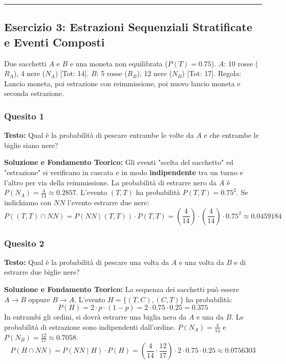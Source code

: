 \documentclass[12pt, a4paper]{article}
\begin{document}
\vspace{0.5cm}\hrule\vspace{0.5cm}

\subsection*{Esercizio 3: Estrazioni Sequenziali Stratificate e Eventi Composti}
Due sacchetti $A$ e $B$ e una moneta non equilibrata ($P(T)=0.75$). 
$A$: 10 rosse ($R_A$), 4 nere ($N_A$) [Tot: 14]. 
$B$: 5 rosse ($R_B$), 12 nere ($N_B$) [Tot: 17]. 
Regola: Lancio moneta, poi estrazione con reimmissione, poi nuovo lancio moneta e seconda estrazione.

\subsubsection*{Quesito 1}
\textbf{Testo:} Qual è la probabilità di pescare entrambe le volte da $A$ e che entrambe le biglie siano nere?

\textbf{Soluzione e Fondamento Teorico:} 
Gli eventi "scelta del sacchetto" ed "estrazione" si verificano in cascata e in modo \textbf{indipendente} tra un turno e l'altro per via della reimmissione.
La probabilità di estrarre nero da $A$ è $P(N_A) = \frac{4}{14} \approx 0.2857$.
L'evento $(T,T)$ ha probabilità $P(T,T) = 0.75^2$. Se indichiamo con $NN$ l'evento estrarre due nere:
$$ P((T,T) \cap NN) = P(NN \mid (T,T)) \cdot P(T,T) = \left(\frac{4}{14}\right) \cdot \left(\frac{4}{14}\right) \cdot 0.75^2 \approx 0.0459184 $$

\subsubsection*{Quesito 2}
\textbf{Testo:} Qual è la probabilità di pescare una volta da $A$ e una volta da $B$ e di estrarre due biglie nere?

\textbf{Soluzione e Fondamento Teorico:} 
La sequenza dei sacchetti può essere $A \to B$ oppure $B \to A$. L'evento $H = \{(T,C), (C,T)\}$ ha probabilità:
$$ P(H) = 2 \cdot p \cdot (1-p) = 2 \cdot 0.75 \cdot 0.25 = 0.375 $$
In entrambi gli ordini, si dovrà estrarre una biglia nera da $A$ e una da $B$. Le probabilità di estrazione sono indipendenti dall'ordine. $P(N_A) = \frac{4}{14}$ e $P(N_B) = \frac{12}{17} \approx 0.7058$.
$$ P(H \cap NN) = P(NN \mid H) \cdot P(H) = \left(\frac{4}{14} \cdot \frac{12}{17}\right) \cdot 2 \cdot 0.75 \cdot 0.25 \approx 0.0756303 $$
\end{document}
